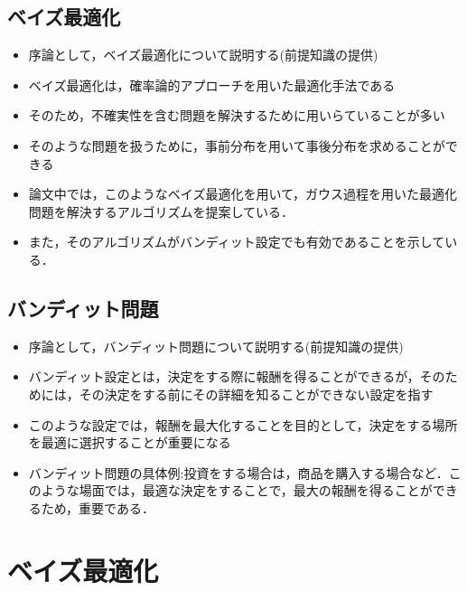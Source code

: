 \documentclass[dvipdfmx, 10.5pt]{beamer}
\begin{document}
\subsection{ベイズ最適化}
\begin{frame}{\insertsubsection}
	\begin{itemize}
		\item 序論として，ベイズ最適化について説明する(前提知識の提供)
		\item ベイズ最適化は，確率論的アプローチを用いた最適化手法である
		\item そのため，不確実性を含む問題を解決するために用いらていることが多い
		\item そのような問題を扱うために，事前分布を用いて事後分布を求めることができる
		\item 論文中では，このようなベイズ最適化を用いて，ガウス過程を用いた最適化問題を解決するアルゴリズムを提案している．
		\item また，そのアルゴリズムがバンディット設定でも有効であることを示している．
	\end{itemize}

\end{frame}


\subsection{バンディット問題}
\begin{frame}{\insertsubsection}
	\begin{itemize}
		\item 序論として，バンディット問題について説明する(前提知識の提供)
		\item バンディット設定とは，決定をする際に報酬を得ることができるが，そのためには，その決定をする前にその詳細を知ることができない設定を指す
		\item このような設定では，報酬を最大化することを目的として，決定をする場所を最適に選択することが重要になる
		\item バンディット問題の具体例:投資をする場合は，商品を購入する場合など．このような場面では，最適な決定をすることで，最大の報酬を得ることができるため，重要である．
	\end{itemize}
\end{frame}


\section{ベイズ最適化}
\end{document}
